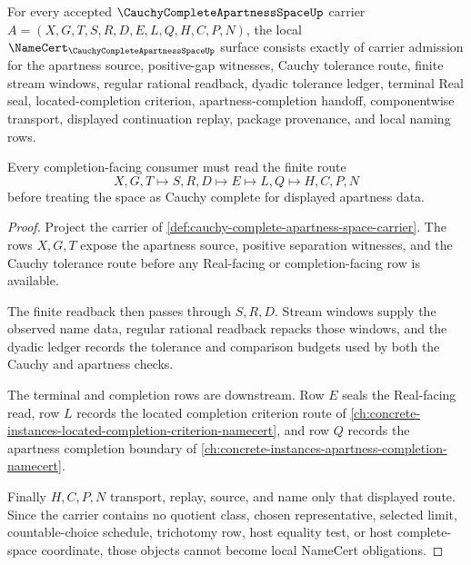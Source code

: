 \begin{theorem}
\label{thm:cauchy-complete-apartness-space-namecert-obligations}
For every accepted $\CauchyCompleteApartnessSpaceUp$ carrier $A=(X,G,T,S,R,D,E,L,Q,H,C,P,N)$, the local $\NameCert_{\CauchyCompleteApartnessSpaceUp}$ surface consists exactly of carrier admission for the apartness source, positive-gap witnesses, Cauchy tolerance route, finite stream windows, regular rational readback, dyadic tolerance ledger, terminal Real seal, located-completion criterion, apartness-completion handoff, componentwise transport, displayed continuation replay, package provenance, and local naming rows.

Every completion-facing consumer must read the finite route
$$
X,G,T\longmapsto S,R,D\longmapsto E\longmapsto L,Q\longmapsto H,C,P,N
$$
before treating the space as Cauchy complete for displayed apartness data.
\end{theorem}
\begin{proof}
Project the carrier of \autoref{def:cauchy-complete-apartness-space-carrier}. The rows $X,G,T$ expose the apartness source, positive separation witnesses, and the Cauchy tolerance route before any Real-facing or completion-facing row is available.

The finite readback then passes through $S,R,D$. Stream windows supply the observed name data, regular rational readback repacks those windows, and the dyadic ledger records the tolerance and comparison budgets used by both the Cauchy and apartness checks.

The terminal and completion rows are downstream. Row $E$ seals the Real-facing read, row $L$ records the located completion criterion route of \autoref{ch:concrete-instances-located-completion-criterion-namecert}, and row $Q$ records the apartness completion boundary of \autoref{ch:concrete-instances-apartness-completion-namecert}.

Finally $H,C,P,N$ transport, replay, source, and name only that displayed route. Since the carrier contains no quotient class, chosen representative, selected limit, countable-choice schedule, trichotomy row, host equality test, or host complete-space coordinate, those objects cannot become local NameCert obligations.
\end{proof}

